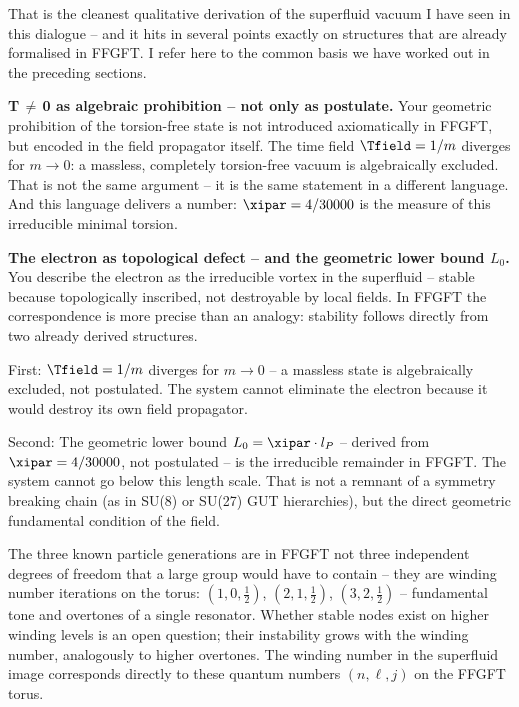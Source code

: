 \begin{response}
That is the cleanest qualitative derivation of the superfluid vacuum I have seen in this dialogue -- and it hits in several points exactly on structures that are already formalised in FFGFT. I refer here to the common basis we have worked out in the preceding sections.

\medskip
\textbf{T\,$\neq$\,0 as algebraic prohibition -- not only as postulate.}
Your geometric prohibition of the torsion-free state is not introduced axiomatically in FFGFT, but encoded in the field propagator itself. The time field $\Tfield = 1/m$ diverges for $m \to 0$: a massless, completely torsion-free vacuum is algebraically excluded. That is not the same argument -- it is the same statement in a different language. And this language delivers a number: $\xipar = 4/30000$ is the measure of this irreducible minimal torsion.

\medskip
\textbf{The electron as topological defect -- and the geometric lower bound $L_0$.}
You describe the electron as the irreducible vortex in the superfluid -- stable because topologically inscribed, not destroyable by local fields. In FFGFT the correspondence is more precise than an analogy: stability follows directly from two already derived structures.

First: $\Tfield = 1/m$ diverges for $m \to 0$ -- a massless state is algebraically excluded, not postulated. The system cannot eliminate the electron because it would destroy its own field propagator.

Second: The geometric lower bound $L_0 = \xipar \cdot l_P$ -- derived from $\xipar = 4/30000$, not postulated -- is the irreducible remainder in FFGFT. The system cannot go below this length scale. That is not a remnant of a symmetry breaking chain (as in SU(8) or SU(27) GUT hierarchies), but the direct geometric fundamental condition of the field.

The three known particle generations are in FFGFT not three independent degrees of freedom that a large group would have to contain -- they are winding number iterations on the torus: $(1,0,\tfrac{1}{2})$, $(2,1,\tfrac{1}{2})$, $(3,2,\tfrac{1}{2})$ -- fundamental tone and overtones of a single resonator. Whether stable nodes exist on higher winding levels is an open question; their instability grows with the winding number, analogously to higher overtones. The winding number in the superfluid image corresponds directly to these quantum numbers $(n, \ell, j)$ on the FFGFT torus.


\end{response}
